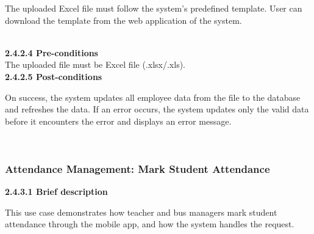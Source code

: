 \par\indent\indent\parbox{0.9\textwidth}{
    The uploaded Excel file must follow the system's predefined template. User can download the template from the web application of the system.
}\\[0.2cm]
\indent\textbf{2.4.2.4 Pre-conditions}\\
\indent\indent The uploaded file must be Excel file (.xlsx/.xls).\\[0.2cm]
\indent\textbf{2.4.2.5 Post-conditions}\\
\vspace{-0.7em}
\par\indent\indent\parbox{0.9\textwidth}{
    On success, the system updates all employee data from the file to the database and refreshes the data. If an error occurs, the system updates only the valid data before it encounters the error and displays an error message.
}\\

\subsubsection{Attendance Management: Mark Student Attendance}
\indent\indent\textbf{2.4.3.1 Brief description}
\vspace{0.5em}
\par\indent\indent\parbox{0.9\textwidth}{
    This use case demonstrates how teacher and bus managers mark student attendance through the mobile app, and how the system handles the request.
}\\

